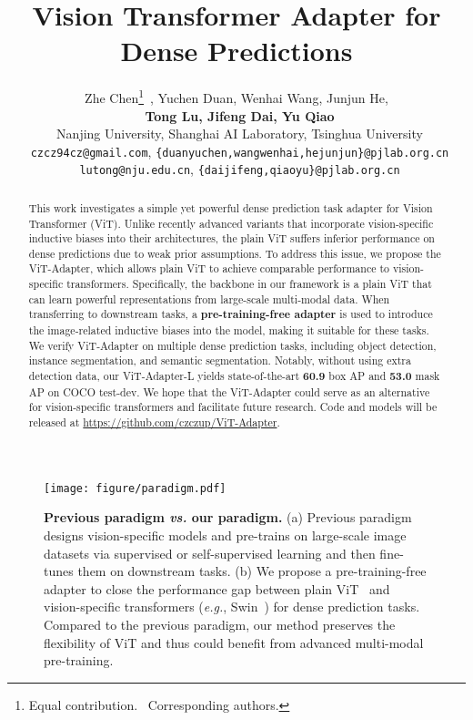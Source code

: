 \documentclass{article} \usepackage{iclr2023_conference,times}
\title{Vision Transformer Adapter for \\ Dense Predictions}
\author{
    Zhe Chen\thanks{Equal contribution. ~\textsuperscript{\Letter}Corresponding authors.}~, Yuchen Duan, Wenhai Wang\textsuperscript{\Letter}, Junjun He, \\
    ~\textbf{Tong Lu\textsuperscript{\Letter}, Jifeng Dai, Yu Qiao}\\
    ~Nanjing University, Shanghai AI Laboratory, Tsinghua University \\
    ~\small{\texttt{czcz94cz@gmail.com}, \texttt{\{duanyuchen,wangwenhai,hejunjun\}@pjlab.org.cn}}\\
    ~\small{\texttt{lutong@nju.edu.cn}, \texttt{\{daijifeng,qiaoyu\}@pjlab.org.cn}}
}
\begin{document}
\def\ie{\textit{i.e.}}
\def\eg{\textit{e.g.}}
\def\etc{etc}
\def\etal{\textit{et al.}}

\maketitle

\vspace{-1em}
\begin{abstract}
This work investigates a simple yet powerful dense prediction task adapter for Vision Transformer (ViT).
Unlike recently advanced variants that incorporate vision-specific inductive biases into their architectures, the plain ViT suffers inferior performance on dense predictions due to weak prior assumptions.
To address this issue, we propose the ViT-Adapter, which allows plain ViT to achieve comparable performance to vision-specific transformers.
Specifically, the backbone in our framework is a plain ViT that can learn powerful representations from large-scale multi-modal data.
When transferring to downstream tasks, a \textbf{pre-training-free adapter} is used to introduce the image-related inductive biases into the model, making it suitable for these tasks.
We verify ViT-Adapter on multiple dense prediction tasks, including object detection, instance segmentation, and semantic segmentation.
Notably, without using extra detection data, our ViT-Adapter-L yields state-of-the-art \textbf{60.9} box AP and \textbf{53.0} mask AP on COCO test-dev.
We hope that the ViT-Adapter could serve as an alternative for vision-specific transformers and facilitate future research.
Code and models will be released at \small{\url{https://github.com/czczup/ViT-Adapter}}.
\end{abstract}

\vspace{-2mm}
\begin{figure}[h]
    \centering
    \texttt{[image: figure/paradigm.pdf]}
    \vspace{-0.5em}
    \caption{
    \textbf{Previous paradigm \emph{vs.} our paradigm.} 
    (a) Previous paradigm designs vision-specific models and pre-trains on large-scale image datasets via supervised or self-supervised learning and then fine-tunes them on downstream tasks.
    (b) We propose a pre-training-free adapter to close the performance gap between plain ViT~\citep{dosovitskiy2020image} and vision-specific transformers (\eg, Swin~\citep{liu2021swin}) for dense prediction tasks.
    Compared to the previous paradigm, our method preserves the flexibility of ViT and thus could benefit from advanced multi-modal pre-training.
    }
    \label{fig:paradigm}
\end{figure}
\vspace{-2.5mm}
\end{document}
